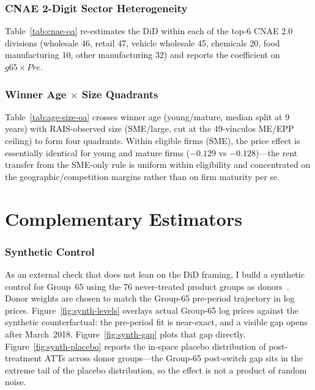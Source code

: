 \documentclass[12pt]{article}
\begin{document}
\section{CNAE 2-Digit Sector Heterogeneity}

Table~\ref{tab:cnae-oa} re-estimates the DiD within each of the top-6 CNAE 2.0 divisions (wholesale 46, retail 47, vehicle wholesale 45, chemicals 20, food manufacturing 10, other manufacturing 32) and reports the coefficient on $g65 \times Pre$.


\section{Winner Age $\times$ Size Quadrants}

Table~\ref{tab:age-size-oa} crosses winner age (young/mature, median split at 9 years) with RAIS-observed size (SME/large, cut at the 49-v\'inculos ME/EPP ceiling) to form four quadrants. Within eligible firms (SME), the price effect is essentially identical for young and mature firms ($-0.129$ vs $-0.128$)---the rent transfer from the SME-only rule is uniform within eligibility and concentrated on the geographic/competition margins rather than on firm maturity per se.


\clearpage

\part{Complementary Estimators}

\section{Synthetic Control}

As an external check that does not lean on the DiD framing, I build a synthetic control for Group~65 using the 76 never-treated product groups as donors~\citep{abadie2010,ben2021}. Donor weights are chosen to match the Group-65 pre-period trajectory in log prices. Figure~\ref{fig:synth-levels} overlays actual Group-65 log prices against the synthetic counterfactual: the pre-period fit is near-exact, and a visible gap opens after March~2018. Figure~\ref{fig:synth-gap} plots that gap directly. Figure~\ref{fig:synth-placebo} reports the in-space placebo distribution of post-treatment ATTs across donor groups---the Group-65 post-switch gap sits in the extreme tail of the placebo distribution, so the effect is not a product of random noise.
\end{document}
